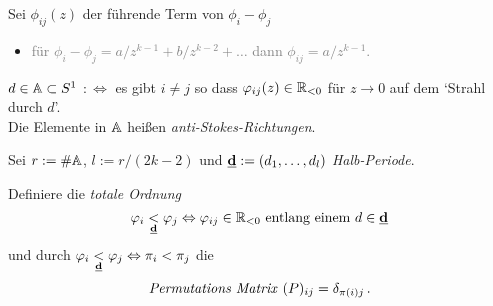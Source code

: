 \begin{defn}
  Sei $\phi_{ij}(z)$ der führende Term von $\phi_i-\phi_j$
  \begin{itemize}
    \item \textcolor{gray}{für $\phi_i-\phi_j=a/z^{k-1}+b/z^{k-2}+\dots$ dann
      $\phi_{ij}=a/z^{k-1}$.}
  \end{itemize}
  $d\in\A\subset S^1$
  $:\Leftrightarrow{}$
  es gibt $i\neq j$ so dass $\phi_{ij}(z)\in\R_{<0}$ für $z\to0$ auf dem
  `Strahl durch $d$'.
  \\Die Elemente in $\A$ heißen \emph{anti-Stokes-Richtungen}.
\end{defn}
\begin{paracol}{2}
\switchcolumn[0]
  Sei $r:=\#\A$, $l:=r/(2k-2)$ und $\textbf{\underline{d}}:=(d_1,\dots,d_l)$
  \emph{Halb-Periode}.
  \begin{defn}
    Definiere die \emph{totale Ordnung}
    \[
      \phi_i\underset{\textbf{\underline{d}}}{<}\phi_j
      \Leftrightarrow{}
      \phi_{ij}\in\R_{<0}\text{
      entlang einem } d\in\textbf{\underline{d}}
    \]
    und durch $\phi_i\underset{\textbf{\underline{d}}}{<}\phi_j
    \Leftrightarrow{}\pi_i<\pi_j$ die
    \[
      \text{\emph{Permutations Matrix} } (P)_{ij}=\delta_{\pi(i)j} \,.
    \]
  \end{defn}
\switchcolumn[1]
  \begin{center}
\end{center}
\end{paracol}
